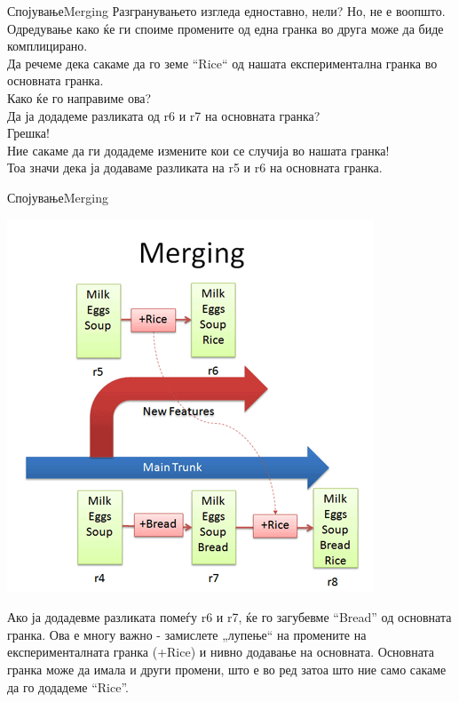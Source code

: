 \begin{frame}{Спојување}{Merging}
Разгранувањето изгледа едноставно, нели? Но, не е воопшто. \\
Одредување како ќе ги споиме промените од една гранка во друга може да биде
комплицирано.\\ 
Да речеме дека сакаме да го земе “Rice“ од нашата експериментална гранка во основната
гранка.\\
Како ќе го направиме ова?\\
\pause
Да ја додадеме разликата од r6 и r7 на основната гранка?\\ 
\pause
\alert{Грешка!}\\
\pause
Ние сакаме да ги додадеме измените кои се случија во нашата гранка!\\
Тоа значи дека ја додаваме разликата на r5 и r6 на основната гранка.
\end{frame}

\begin{frame}{Спојување}{Merging}
\begin{center}
    \includegraphics[scale=0.30]{images/merging.png}
\end{center}
\begin{scriptsize}
Ако ја додадевме разликата помеѓу r6 и r7, ќе го загубевме ``Bread'' од
основната гранка. Ова е многу важно - замислете „лупење“ на промените на експерименталната
гранка (+Rice) и нивно додавање на основната. Основната гранка може да имала и
други промени, што е во ред затоа што ние само сакаме да го додадеме
``Rice''.
\end{scriptsize}
\end{frame}

